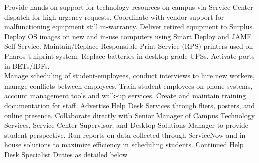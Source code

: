 \documentclass[]{deedy-resume-openfont}
\begin{document}
\begin{minipage}[t]{0.66\textwidth}
\sectionsep
{}
Provide hands-on support for technology resources on campus via Service Center dispatch for high urgency requests. Coordinate with vendor support for malfunctioning equipment still in-warranty. Deliver retired equipment to Surplus. Deploy OS images on new and in-use computers using Smart Deploy and JAMF Self Service. Maintain/Replace Responsible Print Service (RPS) printers used on Pharos Uniprint system. Replace batteries in desktop-grade UPSs. Activate ports in BETs/IDFs.
\sectionsep \\
Manage scheduling of student-employees, conduct interviews to hire new workers, manage conflicts between employees. Train student-employees on phone systems, account management tools and walk-up services. Create and maintain training documentation for staff. Advertise Help Desk Services through fliers, posters, and online presence. Collaborate directly with Senior Manager of Campus Technology Services, Service Center Supervisor, and Desktop Solutions Manager to provide student perspective. Run reports on data collected through ServiceNow and in-house solutions to maximize efficiency in scheduling students. 
\underline{Continued Help Desk Specialist Duties as detailed below}\\ 

\sectionsep


\end{minipage}
\end{document}
